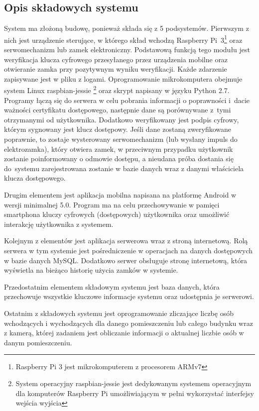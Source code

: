 \subsection{Opis składowych systemu}
System ma złożoną budowę, ponieważ składa się z 5 podsystemów. Pierwszym z nich jest urządzenie sterujące, w którego skład wchodzą Raspberry Pi~3\footnote{ Raspberry Pi 3 jest mikrokomputerem z procesorem ARMv7} oraz serwomechanizm lub zamek elektroniczny. Podstawową funkcją tego modułu jest weryfikacja klucza cyfrowego przesyłanego przez urządzenia mobilne oraz otwieranie zamka przy pozytywnym wyniku weryfikacji. Każde zdarzenie zapisywane jest w pliku z logami. Oprogramowanie mikrokomputera obejmuje system Linux raspbian-jessie \footnote{ System operacyjny raspbian-jessie jest dedykowanym systemem operacyjnym dla komputerów Raspberry Pi umożliwiającym w pełni wykorzystać interfejsy wejścia wyjścia} oraz skrypt napisany w języku Python 2.7. Programy łączą się do serwera w celu pobrania informacji o poprawności i~dacie ważności certyfikatu dostępowego, następnie dane są porównywane z~tymi otrzymanymi od użytkownika. Dodatkowo weryfikowany jest podpis cyfrowy, którym sygnowany jest klucz dostępowy. Jeśli dane zostaną zweryfikowane poprawnie, to zostaje wysterowany serwomechanizm (lub wysłany impuls do elektrozamka), który otwiera zamek, w przeciwnym przypadku użytkownik zostanie poinformowany o odmowie dostępu, a nieudana próba dostania się do~systemu zarejestrowana zostanie w bazie danych wraz z danymi właściciela klucza dostępowego.

Drugim elementem jest aplikacja mobilna napisana na platformę Android w wersji minimalnej 5.0. Program ma na celu przechowywanie w pamięci smartphona kluczy cyfrowych (dostępowych) użytkownika oraz umożliwić interakcję użytkownika z systemem.

Kolejnym z elementów jest aplikacja serwerowa wraz z stroną internetową. Rolą serwera w tym systemie jest pośredniczenie w operacjach na danych dostępowych w bazie danych MySQL. Dodatkowo serwer obsługuje stronę internetową, która wyświetla na bieżąco historię użycia zamków w systemie.

Przedostatnim elementem składowym systemu jest baza danych, która przechowuje wszystkie kluczowe informacje systemu oraz udostępnia je serwerowi.

Ostatnim z składowych systemu jest oprogramowanie zliczające liczbę osób wchodzących i wychodzących dla danego pomieszczeniu lub całego budynku wraz z kamerą, której zadaniem jest obliczanie informacji o aktualnej liczbie osób w danym pomieszczeniu. 


